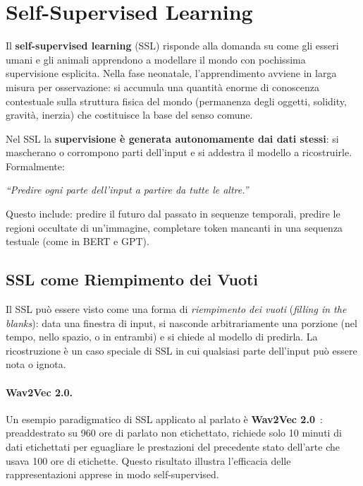 \section{Self-Supervised Learning}
\label{sec:ssl}

Il \textbf{self-supervised learning} (SSL) risponde alla domanda su come
gli esseri umani e gli animali apprendono a modellare il mondo con
pochissima supervisione esplicita. Nella fase neonatale, l'apprendimento
avviene in larga misura per osservazione: si accumula una quantità
enorme di conoscenza contestuale sulla struttura fisica del mondo
(permanenza degli oggetti, solidity, gravità, inerzia) che costituisce
la base del senso comune.

Nel SSL la \textbf{supervisione è generata autonomamente dai dati stessi}:
si mascherano o corrompono parti dell'input e si addestra il modello a
ricostruirle. Formalmente:
\begin{center}
  \emph{``Predire ogni parte dell'input a partire da tutte le altre.''}
\end{center}

Questo include: predire il futuro dal passato in sequenze temporali,
predire le regioni occultate di un'immagine, completare token mancanti
in una sequenza testuale (come in BERT e GPT).

\subsection{SSL come Riempimento dei Vuoti}
\label{subsec:ssl-fill-blanks}

Il SSL può essere visto come una forma di \emph{riempimento dei vuoti}
(\emph{filling in the blanks}): data una finestra di input, si nasconde
arbitrariamente una porzione (nel tempo, nello spazio, o in entrambi) e
si chiede al modello di predirla. La ricostruzione è un caso speciale di
SSL in cui qualsiasi parte dell'input può essere nota o ignota.

\paragraph{Wav2Vec 2.0.}
Un esempio paradigmatico di SSL applicato al parlato è
\textbf{Wav2Vec 2.0}~\citep{baevski2020wav2vec}: preaddestrato su
960 ore di parlato non etichettato, richiede solo 10 minuti di dati
etichettati per eguagliare le prestazioni del precedente stato dell'arte
che usava 100 ore di etichette. Questo risultato illustra l'efficacia
delle rappresentazioni apprese in modo self-supervised.

